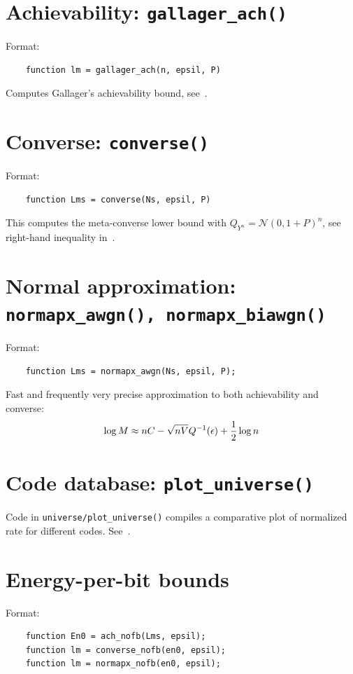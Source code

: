 \documentclass[a4paper,11p]{memoir}
\def\matn{\mathcal{N}}
\begin{document}
\section{Achievability: \texttt{gallager\_ach()}}
Format:
\begin{verbatim}
	function lm = gallager_ach(n, epsil, P)
\end{verbatim}

Computes Gallager's achievability bound, see~\cite[(44)]{PPV08}.

\section{Converse: \texttt{converse()}}
Format:
\begin{verbatim}
	function Lms = converse(Ns, epsil, P)
\end{verbatim}

This computes the meta-converse lower bound with $Q_{Y^n} = \matn(0, 1+P)^n$, see right-hand inequality in~\cite[(218)]{PPV08}. 


\section{Normal approximation: \texttt{normapx\_awgn(), normapx\_biawgn()}}

Format:
\begin{verbatim}
	function Lms = normapx_awgn(Ns, epsil, P);
\end{verbatim}

Fast and frequently very precise approximation to both achievability and converse:
	$$ \log M \approx n C - \sqrt{nV} Q^{-1}(\epsilon) + {1\over2} \log n $$


\section{Code database: \texttt{plot\_universe()}}

Code in \verb|universe/plot_universe()| compiles a comparative plot of normalized rate for different codes.
See~\cite[Section IV.D]{PPV08}.


\section{Energy-per-bit bounds}

Format:
\begin{verbatim}
	function En0 = ach_nofb(Lms, epsil);
	function lm = converse_nofb(en0, epsil);
	function lm = normapx_nofb(en0, epsil);
\end{verbatim}
\end{document}
